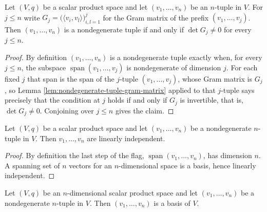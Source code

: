 \begin{lemma}
\label{lem:nondegenerate-tuple-leading-minors}
\leanok
{}
Let $(V,q)$ be a scalar product space and let $(v_1,\ldots,v_n)$ be an $n$-tuple in $V$. For $j \leq n$ write $G_j = \bigl(\langle v_i, v_l\rangle\bigr)_{i,l=1}^{j}$ for the Gram matrix of the prefix $(v_1,\ldots,v_j)$. Then $(v_1,\ldots,v_n)$ is a nondegenerate tuple if and only if $\det G_j \neq 0$ for every $j \leq n$.
\end{lemma}

\begin{proof}
\leanok
{}
By definition $(v_1,\ldots,v_n)$ is a nondegenerate tuple exactly when, for every $j \leq n$, the subspace $\operatorname{span}(v_1,\ldots,v_j)$ is nondegenerate of dimension $j$. For each fixed $j$ that span is the span of the $j$-tuple $(v_1,\ldots,v_j)$, whose Gram matrix is $G_j$, so Lemma \ref{lem:nondegenerate-tuple-gram-matrix} applied to that $j$-tuple says precisely that the condition at $j$ holds if and only if $G_j$ is invertible, that is, $\det G_j \neq 0$. Conjoining over $j \leq n$ gives the claim.
\end{proof}

\begin{lemma}
\label{lem:nondegenerate-tuple-independent}
\leanok
Let $(V,q)$ be a scalar product space and let $(v_1,\ldots,v_n)$ be a nondegenerate $n$-tuple in $V$. Then $v_1,\ldots,v_n$ are linearly independent.
\end{lemma}

\begin{proof}
\leanok
By definition the last step of the flag, $\operatorname{span}(v_1,\ldots,v_n)$, has dimension $n$. A spanning set of $n$ vectors for an $n$-dimensional space is a basis, hence linearly independent.
\end{proof}

\begin{lemma}
\label{lem:nondegenerate-tuple-basis}
\leanok
{}
Let $(V,q)$ be an $n$-dimensional scalar product space and let $(v_1,\ldots,v_n)$ be a nondegenerate $n$-tuple in $V$. Then $(v_1,\ldots,v_n)$ is a basis of $V$.
\end{lemma}

